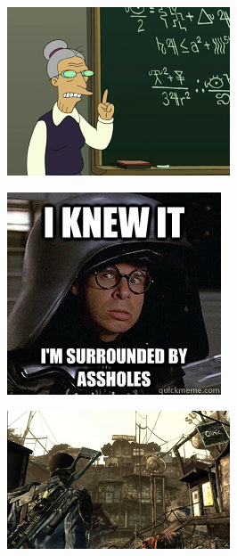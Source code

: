\begin{figure}
	\begin{center}
		\includegraphics[width=\figwidth]{pics/6/4.png}
	\end{center}
\end{figure}

\begin{figure}
	\begin{center}
		\includegraphics[width=\figwidth]{pics/6/5.png}
	\end{center}
\end{figure}

\begin{figure}
	\begin{center}
		\includegraphics[width=\figwidth]{pics/6/6.png}
	\end{center}
\end{figure}

